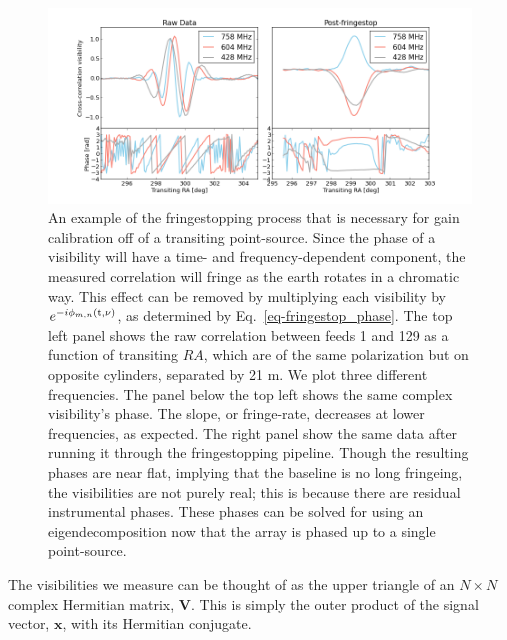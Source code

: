 \begin{figure}[!h]
\begin{center}
\vspace{1cm}
\includegraphics[trim={1in 0in 1in 1in}, width=\smwidth]{./figures/beamforming/thesis_fringestop.png}
\caption[abc]{An example of the fringestopping process that is 
 necessary for gain calibration off of a transiting point-source. Since 
 the phase of a visibility will have a time- and frequency-dependent 
 component, the measured correlation will fringe as the earth rotates in 
 a chromatic way. This effect can be removed by multiplying each visibility by 
 $e^{-i \phi_{m, n}(\rm t, \nu)}$, as determined by Eq.~\ref{eq-fringestop_phase}. 
 The top left panel shows the raw correlation between feeds 1 and 129 as a function of transiting
 $RA$, which are of the same polarization but 
 on opposite cylinders, separated by 21 m. We plot  
 three different frequencies. The panel below the top left
 shows the same complex visibility's phase. The slope, or fringe-rate, decreases 
 at lower frequencies, as expected. The right panel show the same data 
 after running it through the fringestopping pipeline. Though the resulting 
 phases are near flat, implying that the baseline is no long fringeing, 
 the visibilities are not purely real; this is because there are residual 
 instrumental phases. These phases can be solved for using an 
 eigendecomposition now that the array is phased up to a single point-source.}  
 \label{fig-fringestop}
\end{center}
\end{figure}



The visibilities we measure can be thought of as 
the upper triangle of an $N\times N$ complex Hermitian 
matrix, $\mathbf{V}$. This is simply the outer product of the 
signal vector, $\mathbf{x}$, with its Hermitian conjugate. 

